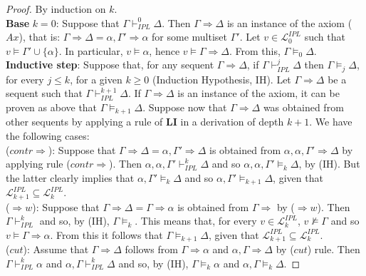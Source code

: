 \documentclass[10pt,a4paper]{amsart}
\begin{document}
\begin{proof}
By induction on $k$.\\[1mm]
%
{\bf Base} $k=0$: Suppose that $\Gamma \vdash_{IPL}^0 \Delta$. Then  $\Gamma \Rightarrow\Delta$ is an instance of the axiom ($Ax$), that is:  $\Gamma \Rightarrow\Delta = \alpha,\Gamma' \Rightarrow \alpha$ for some multiset $\Gamma'$. Let $v \in \mathcal{L}_0^{IPL}$ such that $v \models \Gamma' \cup \{\alpha\}$. In particular, $v \models \alpha$, hence $v \models \Gamma \Rightarrow\Delta$. From this,  $\Gamma \models_0 \Delta$.\\[1mm]
%
{\bf Inductive step}: Suppose that, for any sequent  $\Gamma \Rightarrow\Delta$, if $\Gamma \vdash_{IPL}^j \Delta$ then  $\Gamma\models_j\Delta$, for every $j \leq k$, for a given $k \geq 0$ (Induction Hypothesis, IH). Let $\Gamma \Rightarrow\Delta$ be a sequent such that $\Gamma \vdash_{IPL}^{k+1} \Delta$. If $\Gamma \Rightarrow \Delta$ is an instance of the axiom, it can be proven as above that  $\Gamma\models_{k+1}\Delta$. Suppose now that $\Gamma \Rightarrow\Delta$ was obtained from other sequents by applying a rule of {\bf LI} in a derivation of depth $k+1$. We have the following cases:\\[1mm]
%
($contr\Rightarrow$): Suppose that  $\Gamma \Rightarrow\Delta= \alpha,\Gamma' \Rightarrow\Delta$ is obtained from $\alpha,\alpha,\Gamma'\Rightarrow\Delta$ by applying rule ($contr\Rightarrow$). Then $\alpha,\alpha,\Gamma' \vdash_{IPL}^k \Delta$ and so $\alpha,\alpha,\Gamma' \models_k \Delta$, by (IH). But the latter clearly implies that $\alpha,\Gamma' \models_k \Delta$ and so  $\alpha,\Gamma' \models_{k+1} \Delta$,  given that $\mathcal{L}_{k+1}^{IPL} \subseteq \mathcal{L}_k^{IPL}$.\\[1mm]
%
($\Rightarrow w$): Suppose that  $\Gamma \Rightarrow\Delta= \Gamma \Rightarrow\alpha$ is obtained from $\Gamma\Rightarrow$ by ($\Rightarrow w$). Then  $\Gamma \vdash_{IPL}^k $ and so, by (IH), $\Gamma\models_k$.  This means that, for every $v \in \mathcal{L}_k^{IPL}$, $v\not\models \Gamma$ and so $v\models\Gamma\Rightarrow \alpha$. From this it follows that $\Gamma\models_{k+1}\Delta$,  given that $\mathcal{L}_{k+1}^{IPL} \subseteq \mathcal{L}_k^{IPL}$.\\[1mm]
%
($cut$): Assume that $\Gamma \Rightarrow\Delta$ follows from $\Gamma\Rightarrow\alpha$ and $\alpha, \Gamma\Rightarrow\Delta$ by ($cut$) rule. Then  $\Gamma\vdash_{IPL}^k\alpha$ and $\alpha, \Gamma\vdash_{IPL}^k\Delta$ and so, by (IH),  $\Gamma \models_k\alpha$ and $\alpha, \Gamma \models_k\Delta$.

\end{proof}
\end{document}
